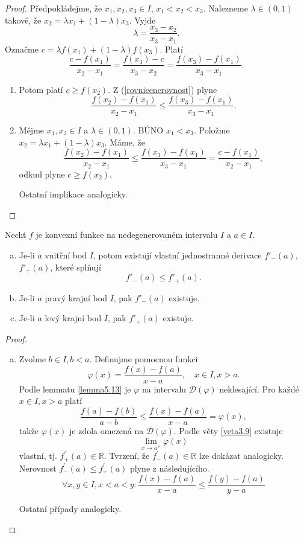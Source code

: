 \begin{proof}
	Předpokládejme, že $x_1,x_2,x_3 \in I$, $x_1< x_2< x_3$. Nalezneme $\lambda \in (0,1)$ takové, že  $x_2 = \lambda x_1 + (1-\lambda)x_3$.
	Vyjde
	$$
	    \lambda = \frac{x_3-x_2}{x_3-x_1}.
	$$
	Označme $c=\lambda f(x_1)+ (1-\lambda)f(x_3)$. Platí
	\begin{equation}\label{rovnicenerovnost}
	\frac{c-f(x_1)}{x_2-x_1} = \frac{f(x_3)-c}{x_3-x_2}=\frac{f(x_3)-f(x_1)}{x_3-x_1}.
	\end{equation}
	\begin{enumerate}
		\item[(i) $\implies$ (ii)] Potom platí $c\geq f(x_2)$. Z (\ref{rovnicenerovnost}) plyne
		$$
            \frac{f(x_2)-f(x_1)}{x_2-x_1} \leq \frac{f(x_3)-f(x_1)}{x_3-x_1}.
		$$
		\item[(ii) $\implies$ (i)] Mějme $x_1, x_3 \in I$ a $\lambda \in (0,1). $ BÚNO $x_1<x_3$. Položme
		$x_2 = \lambda x_1 + (1-\lambda)x_3$. Máme, že
		$$
  \frac{f(x_2)-f(x_1)}{x_2-x_1} \leq \frac{f(x_3)-f(x_1)}{x_3-x_1} = \frac{c-f(x_1)}{x_2-x_1},
		$$
		odkud plyne $c\geq f(x_2)$.
		\par Ostatní implikace analogicky. \qedhere
	\end{enumerate}
\end{proof}

\begin{veta} \label{veta5.14}
Nechť $f$ je konvexní funkce na nedegenerovaném intervalu $I$ a $a \in I$.
\begin{enumerate}[(a)]
\item Je-li $a$ vnitřní bod $I$, potom existují vlastní jednostranné derivace $f'_-(a)$, $f'_+(a)$, které splňují
\[
f'_-(a) \leq f'_+(a).
\]
\item Je-li $a$ pravý krajní bod $I$, pak $f'_-(a)$ existuje.
\item Je-li $a$ levý krajní bod $I$, pak $f'_+(a)$ existuje.
\end{enumerate}
\end{veta}

\begin{proof}
\begin{enumerate}[(a)]
	\item Zvolme $b \in I, b < a$. Definujme pomocnou funkci
	$$
	    \varphi (x) = \frac{f(x)-f(a)}{x-a}, \quad x\in I, x > a.
	$$
	Podle lemmatu \ref{lemma5.13} je $\varphi$ na intervalu $\mathcal D(\varphi)$ neklesající.
	Pro každé $x \in I, x > a$ platí
	$$
 \frac{f(a)-f(b)}{a-b} \leq \frac{f(x)-f(a)}{x-a} = \varphi(x),
	$$
	takže $\varphi(x)$ je zdola omezená na $\mathcal D(\varphi)$. Podle věty \ref{veta3.9} existuje
	$$
 \lim_{x\to a^+} \varphi(x)
	$$
	vlastní, tj. $f^\prime_+(a)\in \mathbb R $. Tvrzení, že $f^\prime_-(a) \in \mathbb R $
	lze dokázat analogicky.
	Nerovnost $f^\prime_-(a) \leq f^\prime_+(a)$ plyne z následujícího.
	$$
	    \forall x,y \in I, x< a< y: \frac{f(x)-f(a)}{x-a} \leq \frac{f(y)-f(a)}{y-a}
	$$
	\par Ostatní případy analogicky. \qedhere
\end{enumerate}
\end{proof}

